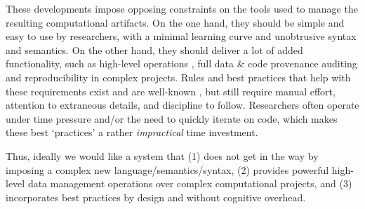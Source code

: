 These developments impose opposing constraints on the tools used to manage the
resulting computational artifacts. On the one hand, they should be simple and
easy to use by researchers, with a minimal learning curve and unobtrusive syntax
and semantics. On the other hand, they should deliver a lot of added
functionality, such as high-level operations \citep{wickham2014tidy}, full data
\& code provenance auditing \citep{davidson2008provenance} and reproducibility
\citep{ivie2018reproducibility} in complex projects.  Rules and best practices
that help with these requirements exist and are well-known
\citep{sandve2013ten,wilkinson2016fair}, but still require manual effort,
attention to extraneous details, and discipline to follow. Researchers often
operate under time pressure and/or the need to quickly iterate on code, which
makes these best `practices' a rather \emph{impractical} time investment.

Thus, ideally we would like a system that (1) does not get in the way by
imposing a complex new language/semantics/syntax, (2) provides powerful
high-level data management operations over complex computational projects, and
(3) incorporates best practices by design and without cognitive overhead.

